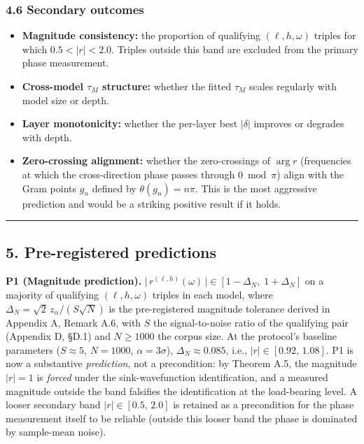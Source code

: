 \documentclass[
  letterpaper,
  11pt]{article}
\providecommand{\tightlist}{%
  \setlength{\itemsep}{0pt}\setlength{\parskip}{0pt}}
\theoremstyle{plain}
\theoremstyle{definition}
\theoremstyle{remark}
\begin{document}
\subsubsection{4.6 Secondary outcomes}\label{secondary-outcomes}

\begin{itemize}
\tightlist
\item
  \textbf{Magnitude consistency:} the proportion of qualifying \((\ell, h, \omega)\) triples for which \(0.5 < |r| < 2.0\). Triples outside this band are excluded from the primary phase measurement.
\item
  \textbf{Cross-model \(\tau_M\) structure:} whether the fitted \(\tau_M\) scales regularly with model size or depth.
\item
  \textbf{Layer monotonicity:} whether the per-layer best \(|\delta|\) improves or degrades with depth.
\item
  \textbf{Zero-crossing alignment:} whether the zero-crossings of \(\arg r\) (frequencies at which the cross-direction phase passes through \(0 \bmod \pi\)) align with the Gram points \(g_n\) defined by \(\theta(g_n) = n\pi\). This is the most aggressive prediction and would be a striking positive result if it holds.
\end{itemize}

\begin{center}\rule{0.5\linewidth}{0.5pt}\end{center}

\subsection{5. Pre-registered predictions}\label{pre-registered-predictions}

\textbf{P1 (Magnitude prediction).} \(\bigl|\,r^{(\ell, h)}(\omega)\,\bigr| \in [1 - \Delta_N,\; 1 + \Delta_N]\) on a majority of qualifying \((\ell, h, \omega)\) triples in each model, where \(\Delta_N = \sqrt{2}\,z_\alpha/(S\sqrt{N})\) is the pre-registered magnitude tolerance derived in Appendix A, Remark A.6, with \(S\) the signal-to-noise ratio of the qualifying pair (Appendix D, §D.1) and \(N \geq 1000\) the corpus size. At the protocol's baseline parameters (\(S \approx 5\), \(N = 1000\), \(\alpha = 3\sigma\)), \(\Delta_N \approx 0.085\), i.e., \(|r| \in [0.92,\,1.08]\). P1 is now a substantive \emph{prediction}, not a precondition: by Theorem A.5, the magnitude \(|r| = 1\) is \emph{forced} under the sink-wavefunction identification, and a measured magnitude outside the band falsifies the identification at the load-bearing level. A looser secondary band \(|r| \in [0.5,\,2.0]\) is retained as a precondition for the phase measurement itself to be reliable (outside this looser band the phase is dominated by sample-mean noise).
\end{document}
